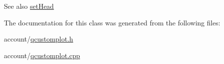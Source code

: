 \begin{DoxySeeAlso}{\-See also}
\hyperlink{classQCPItemCurve_a08a30d9cdd63995deea3d9e20430676f}{set\-Head} 
\end{DoxySeeAlso}


\-The documentation for this class was generated from the following files\-:\begin{DoxyCompactItemize}
\item 
account/\hyperlink{qcustomplot_8h}{qcustomplot.\-h}\item 
account/\hyperlink{qcustomplot_8cpp}{qcustomplot.\-cpp}\end{DoxyCompactItemize}
